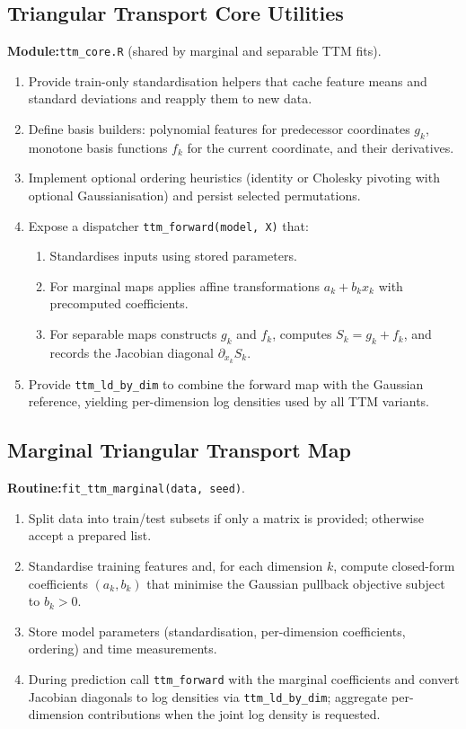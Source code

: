 \documentclass[11pt,a4paper,twoside]{book}\usepackage[]{graphicx}\usepackage[]{xcolor}
\begin{document}
\subsection{Triangular Transport Core Utilities}\label{app:ttm-core}

\textbf{Module:}\quad\texttt{ttm\_core.R} (shared by marginal and separable TTM fits).

\begin{enumerate}
  \item Provide train-only standardisation helpers that cache feature means and standard deviations and reapply them to new data.
  \item Define basis builders: polynomial features for predecessor coordinates $g_k$, monotone basis functions $f_k$ for the current coordinate, and their derivatives.
  \item Implement optional ordering heuristics (identity or Cholesky pivoting with optional Gaussianisation) and persist selected permutations.
  \item Expose a dispatcher \texttt{ttm\_forward(model, X)} that:
    \begin{enumerate}
      \item Standardises inputs using stored parameters.
      \item For marginal maps applies affine transformations $a_k + b_k x_k$ with precomputed coefficients.
      \item For separable maps constructs $g_k$ and $f_k$, computes $S_k = g_k + f_k$, and records the Jacobian diagonal $\partial_{x_k} S_k$.
    \end{enumerate}
  \item Provide \texttt{ttm\_ld\_by\_dim} to combine the forward map with the Gaussian reference, yielding per-dimension log densities used by all TTM variants.
\end{enumerate}

\subsection{Marginal Triangular Transport Map}\label{app:ttm-marg}

\textbf{Routine:}\quad\texttt{fit\_ttm\_marginal(data, seed)}.

\begin{enumerate}
  \item Split data into train/test subsets if only a matrix is provided; otherwise accept a prepared list.
  \item Standardise training features and, for each dimension $k$, compute closed-form coefficients $(a_k, b_k)$ that minimise the Gaussian pullback objective subject to $b_k > 0$.
  \item Store model parameters (standardisation, per-dimension coefficients, ordering) and time measurements.
  \item During prediction call \texttt{ttm\_forward} with the marginal coefficients and convert Jacobian diagonals to log densities via \texttt{ttm\_ld\_by\_dim}; aggregate per-dimension contributions when the joint log density is requested.
\end{enumerate}
\end{document}
